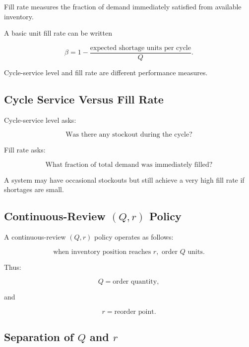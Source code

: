 Fill rate measures the fraction of demand immediately satisfied from
available inventory.

A basic unit fill rate can be written

\[
\boxed{
\beta
=
1
-
\frac{
\text{expected shortage units per cycle}
}{
Q
}.
}
\]

Cycle-service level and fill rate are different performance measures.

\subsection{Cycle Service Versus Fill Rate}
\label{subsec:cycle-service-versus-fill-rate}

Cycle-service level asks:

\[
\boxed{
\text{Was there any stockout during the cycle?}
}
\]

Fill rate asks:

\[
\boxed{
\text{What fraction of total demand was immediately filled?}
}
\]

A system may have occasional stockouts but still achieve a very high fill
rate if shortages are small.

\subsection{Continuous-Review \((Q,r)\) Policy}
\label{subsec:q-r-policy}

A continuous-review \((Q,r)\) policy operates as follows:

\[
\boxed{
\text{when inventory position reaches }r,
\text{ order }Q\text{ units}.
}
\]

Thus:

\[
Q
=
\text{order quantity},
\]

and

\[
r
=
\text{reorder point}.
\]

\subsection{Separation of \(Q\) and \(r\)}
\label{subsec:q-r-separation}

